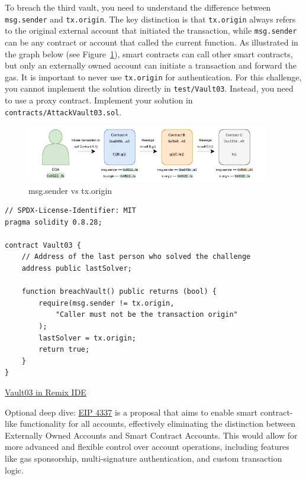 \documentclass[12pt]{article}
\begin{document}
\noindent
To breach the third vault, you need to understand the difference between \texttt{msg.sender} and \texttt{tx.origin}. The key distinction is that \texttt{tx.origin} always refers to the original external account that initiated the transaction, while \texttt{msg.sender} can be any contract or account that called the current function. As illustrated in the graph below (see Figure~\ref{fig:msg.sender}), smart contracts can call other smart contracts, but only an externally owned account can initiate a transaction and forward the gas. It is important to never use \texttt{tx.origin} for authentication. For this challenge, you cannot implement the solution directly in \texttt{test/Vault03}. Instead, you need to use a proxy contract. Implement your solution in \texttt{contracts/AttackVault03.sol}.

\begin{figure}[h!]
  \centering
  \includegraphics[width=0.95\textwidth]{msg.sender.pdf}
  \caption{msg.sender vs tx.origin}
  \label{fig:msg.sender}
\end{figure}

\begin{lstlisting}[language=Solidity]
// SPDX-License-Identifier: MIT
pragma solidity 0.8.28;

contract Vault03 {
    // Address of the last person who solved the challenge
    address public lastSolver;

    function breachVault() public returns (bool) {
        require(msg.sender != tx.origin,
            "Caller must not be the transaction origin"
        );
        lastSolver = tx.origin;
        return true;
    }
}
\end{lstlisting}

\medskip
\noindent
\href{https://remix.ethereum.org/?#activate=solidity&url=https://github.com/radovluk/unbreakable-vault/contracts/Vault03.sol&lang=en&optimize=false&runs=200&evmVersion=null&version=soljson-v0.8.28+commit.7893614a.js}{Vault03 in Remix IDE}

\medskip
\noindent
Optional deep dive:
\href{https://eips.ethereum.org/EIPS/eip-4337}{EIP 4337} is a proposal that aims to enable smart contract-like functionality for all accounts, effectively eliminating the distinction between Externally Owned Accounts and Smart Contract Accounts. This would allow for more advanced and flexible control over account operations, including features like gas sponsorship, multi-signature authentication, and custom transaction logic.
\end{document}
